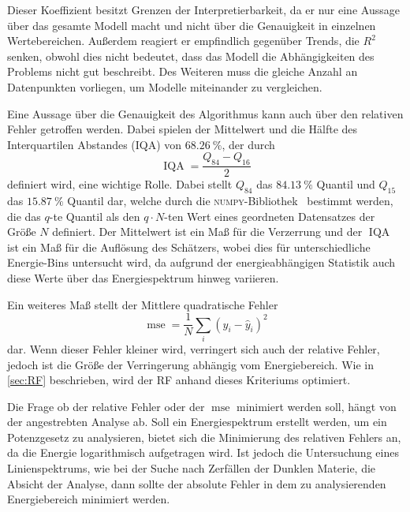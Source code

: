 Dieser Koeffizient besitzt Grenzen der Interpretierbarkeit, da er nur eine Aussage über das gesamte Modell macht und
nicht über die Genauigkeit in einzelnen Wertebereichen.
Außerdem reagiert er empfindlich gegenüber Trends, die $R^2$ senken, obwohl dies nicht bedeutet, dass das Modell die Abhängigkeiten des Problems
nicht gut beschreibt.
Des Weiteren muss die gleiche Anzahl an Datenpunkten vorliegen, um Modelle
miteinander zu vergleichen.

Eine Aussage über die Genauigkeit des Algorithmus kann auch über den relativen Fehler getroffen werden. Dabei spielen der Mittelwert und die
Hälfte des Interquartilen Abstandes (IQA) von $\SI{68.26}{\percent}$, der durch
\begin{equation}
  \operatorname{IQA} = \frac{Q_{84}-Q_{16}}{2}
\end{equation}
definiert wird, eine wichtige Rolle.
Dabei stellt $Q_{84}$ das $\SI{84.13}{\percent}$ Quantil und $Q_{15}$ das $\SI{15.87}{\percent}$ Quantil dar, welche durch die \textsc{numpy}-Bibliothek~\cite{scipy}
bestimmt werden, die das $q$-te Quantil als den $q \cdot N$-ten Wert eines geordneten Datensatzes der Größe $N$ definiert.
Der Mittelwert ist ein Maß für die Verzerrung und der $\operatorname{IQA}$ ist ein Maß für die Auflösung des Schätzers, wobei dies für unterschiedliche
Energie-Bins untersucht wird, da aufgrund der energieabhängigen Statistik auch diese Werte über das Energiespektrum hinweg variieren.

Ein weiteres Maß stellt der Mittlere quadratische Fehler
\begin{equation}
  \operatorname{mse} = \frac{1}{N} \sum_i (y_i-\hat{y}_i)^2
\end{equation}
dar.
Wenn dieser Fehler kleiner wird, verringert sich auch der relative Fehler, jedoch ist die Größe der Verringerung abhängig vom Energiebereich.
Wie in \autoref{sec:RF} beschrieben, wird der RF anhand dieses Kriteriums optimiert.

Die Frage ob der relative Fehler oder der $\operatorname{mse}$ minimiert werden soll, hängt von der angestrebten Analyse ab.
Soll ein Energiespektrum erstellt werden, um ein Potenzgesetz zu analysieren, bietet sich die Minimierung des relativen Fehlers an, da die
Energie logarithmisch aufgetragen wird.
Ist jedoch die Untersuchung eines Linienspektrums, wie bei der Suche nach Zerfällen der Dunklen Materie, die Absicht der Analyse, dann sollte
der absolute Fehler in dem zu analysierenden Energiebereich minimiert werden.


